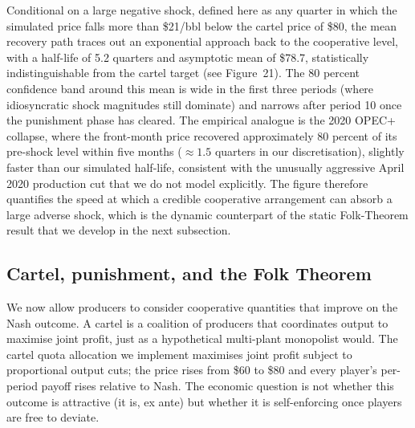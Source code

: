 Conditional on a large negative shock, defined here as any quarter in
which the simulated price falls more than \$21/bbl below the cartel
price of \$80, the mean recovery path traces out an exponential
approach back to the cooperative level, with a half-life of 5.2 quarters
and asymptotic mean of \$78.7, statistically indistinguishable from the
cartel target (see Figure~21). The 80 percent confidence band around
this mean is wide in the first three periods (where idiosyncratic shock
magnitudes still dominate) and narrows after period 10 once the
punishment phase has cleared. The empirical analogue is the 2020 OPEC+
collapse, where the front-month price recovered approximately 80 percent
of its pre-shock level within five months ($\approx 1.5$ quarters in
our discretisation), slightly faster than our simulated half-life,
consistent with the unusually aggressive April 2020 production cut that
we do not model explicitly. The figure therefore quantifies the speed
at which a credible cooperative arrangement can absorb a large adverse
shock, which is the dynamic counterpart of the static Folk-Theorem
result that we develop in the next subsection.

\subsection{Cartel, punishment, and the Folk Theorem}
\label{subsec:folk}

We now allow producers to consider cooperative quantities that improve
on the Nash outcome. A cartel is a coalition of producers that
coordinates output to maximise joint profit, just as a hypothetical
multi-plant monopolist would. The cartel quota allocation we implement
maximises joint profit subject to proportional output cuts; the price
rises from \$60 to \$80 and every player's per-period payoff rises
relative to Nash. The economic question is not whether this outcome is
attractive (it is, ex ante) but whether it is self-enforcing once
players are free to deviate.

